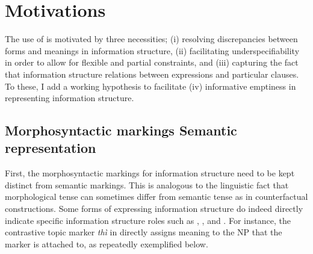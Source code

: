 \section{Motivations}
\label{9:sec:motivations}

The use of  is motivated by three necessities; (i)
resolving discrepancies between forms and meanings in information
structure, (ii) facilitating underspecifiability in order to allow for
flexible and partial constraints, and (iii) capturing the fact that
information structure relations between expressions and particular
clauses.  To these, I add a working hypothesis to facilitate (iv)
informative emptiness in representing information structure.



\subsection{Morphosyntactic markings \vs Semantic representation}
\label{9:ssec:ms-vs-sr}

First, the morphosyntactic markings for information structure need to
be kept distinct from semantic markings. This is analogous to the
linguistic fact that morphological tense can sometimes differ from
semantic tense as in counterfactual constructions. Some forms of
expressing information structure do indeed directly indicate specific
information structure roles such as , , and
. For instance, the contrastive topic marker
\textit{th{\`i}} in  directly assigns  meaning to the NP that the marker is attached to, as
repeatedly exemplified below.


